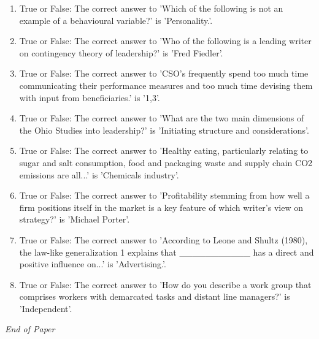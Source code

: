 \documentclass[12pt]{article}
\begin{document}
\begin{enumerate}[label=\arabic*.]
\item True or False: The correct answer to 'Which of the following is not an example of a behavioural variable?' is 'Personality.'.
\item True or False: The correct answer to 'Who of the following is a leading writer on contingency theory of leadership?' is 'Fred Fiedler'.
\item True or False: The correct answer to 'CSO's frequently spend too much time communicating their performance measures and too much time devising them with input from beneficiaries.' is '1,3'.
\item True or False: The correct answer to 'What are the two main dimensions of the Ohio Studies into leadership?' is 'Initiating structure and considerations'.
\item True or False: The correct answer to 'Healthy eating, particularly relating to sugar and salt consumption, food and packaging waste and supply chain CO2 emissions are all...' is 'Chemicals industry'.
\item True or False: The correct answer to 'Profitability stemming from how well a firm positions itself in the market is a key feature of which writer's view on strategy?' is 'Michael Porter'.
\item True or False: The correct answer to 'According to Leone and Shultz (1980), the law-like generalization 1 explains that \_\_\_\_\_\_\_\_\_\_\_ has a direct and positive influence on...' is 'Advertising.'.
\item True or False: The correct answer to 'How do you describe a work group that comprises workers with demarcated tasks and distant line managers?' is 'Independent'.
\end{enumerate}

\vfill
\noindent\textit{End of Paper}
\end{document}
